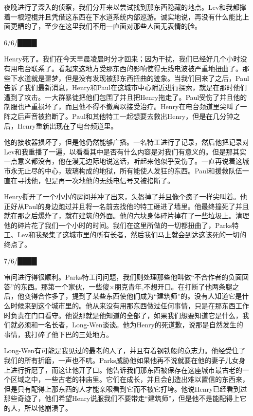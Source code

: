 夜晚进行了深入的侦察，我们分开来以尝试找到那东西隐藏的地点。Lev和我都撑着一根短棍并且凭借这东西在下水道系统内部巡游。诚实地说，再没有什么能比上面更糟的了，至少在这里我们不用一直面对那些人面无表情的脸。

\hr

6\slash 6\slash ████

Henry死了。我们在今天早晨凌晨时分才回来；因为干扰，我们已经好几个小时没有用电台联系了。看起来这地方受那东西的影响使得无线电波被严重地扭曲了。那些下水道就是噩梦，但是没有发现被那东西扭曲的迹象。当我们回来了之后，Paul告诉了我们最新消息，Henry和Paul在这城市中心附近进行探索，就是在那时他们遭到了攻击。一大群暴徒把他们包围了并且把Henry拖走了。Paul受伤了并且他的制服也严重损坏了，而且他不得不撤离以接受治疗。Henry在电台频道里尖叫了一阵之后声音被掐断了。Paul和其他特工一起想要去救出Henry，但是在几分钟之后，Henry重新出现在了电台频道里。

他的接收器损坏了，但是他仍然能够广播。一名特工进行了记录，然后他把记录对Lev和我重播了一遍，以看看其中是否有什么内容是对我们有意义的。但是那其实一点意义都没有，他在漫无边际地说这话，听起来他似乎受伤了。一直再说着这城市永无止尽的中心，玻璃构成的地狱，所有能使人发狂的东西。Paul和援救队伍一直在寻找他，但是再一次地他的无线电信号又被掐断了。

Henry撕开了一个小小的房间并冲了出来，头盔掉了并且像个疯子一样尖叫着。他正好从Paul的身边跑过并且将一名前去找他的特工砸进了墙里。他最终撞死了并且就在那之后爆炸了，就在建筑的外面。他的六块身体碎片掉在了一些垃圾上。清理他的碎片花了我们一个小时的时间。我们在这里所做的一切都扭曲了，Parks特工、Lev和我聚集了这城市里的所有长者，然后我们马上就会到达这该死的一切的终点了。

\hr

7\slash 6\slash ████

审问进行得很顺利。Parks特工问问题，我们则处理那些他叫做“不合作者的负面回答”的东西。那第一个家伙，一些傻×朋克青年,不想开口。在打断了他两条腿之后，他变得合作多了，提到了某些东西使他们成为“建筑师”的。没有人知道它是什么时候来到这个城市里的。他从来没有用那东西做过任何事情，只是在那东西工作时负责在门口看守。他说那就是他知道的全部了，如果我们想要知道它是什么，我们就必须和一名长者，Long-Wen谈谈。他为Henry的死道歉，说那是自然发生的事情，我打碎了他下巴的三处地方。

Long-Wen有可能是我见过的最老的人了，并且有着钢铁般的意志力。他经受住了我们的所有折磨，一声也不吭。Parks威胁他如果他再不说就要在他的妻子儿女身上进行折磨了，而这让他开了口。他告诉我们那东西被保存在这座城市最古老的一个区域之中，一些古老的神庙里。它们在成长，并且会创造出难以置信的东西来，但是只有配得上那东西的人才能亲眼看到它而不被它打垮。他说Henry已经看到过那些奇迹了，他们希望Henry说服我们不要带走“建筑师”，但是他不是能配得上它的人，所以他崩溃了。

